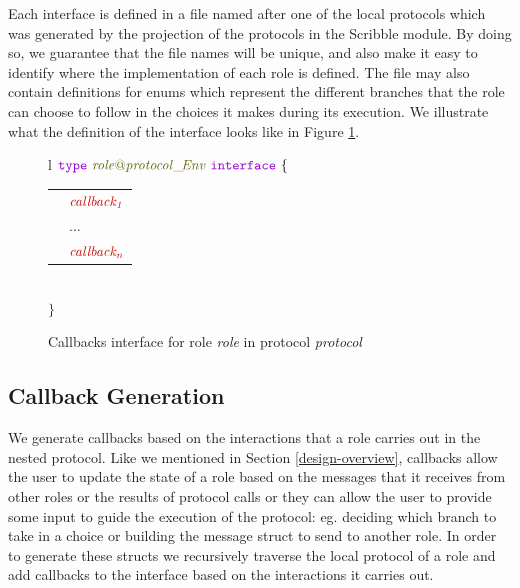 \documentclass[12pt,twoside]{report}
\begin{document}
Each interface is defined in a file named after one of the local protocols which was generated by the projection of the protocols in the Scribble module. By doing so, we guarantee that the file names will be unique, and also make it easy to identify where the implementation of each role is defined. The file may also contain definitions for enums which represent the different branches that the role can choose to follow in the choices it makes during its execution. We illustrate what the definition of the interface looks like in Figure \ref{callbacks-interface-gen}.\\

\begin{figure}[!h]
    \begin{center}
        \begin{tabular}{l}
            $\gotype\ \interfacename{\localprotocol{role}{protocol}\_\!Env}\ \gointerface\ \{$ \\[3pt]
            \begin{tabular}{ll}
                \indent & $\functionname{callback_1}$\\[3.5pt]
                \indent & ...\\[3.5pt]
                \indent & $\functionname{callback_n}$\\[3.5pt]
            \end{tabular}\\[3pt]
            $\}$
        \end{tabular}

    \end{center}
    \caption{Callbacks interface for role \textit{role} in protocol \textit{protocol}}
    \label{callbacks-interface-gen}
\end{figure}

\subsection{Callback Generation}

We generate callbacks based on the interactions that a role carries out in the nested protocol. Like we mentioned in Section \ref{design-overview}, callbacks allow the user to update the state of a role based on the messages that it receives from other roles or the results of protocol calls or they can allow the user to provide some input to guide the execution of the protocol: eg. deciding which branch to take in a choice or building the message struct to send to another role. In order to generate these structs we recursively traverse the local protocol of a role and add callbacks to the interface based on the interactions it carries out.\\
\end{document}
